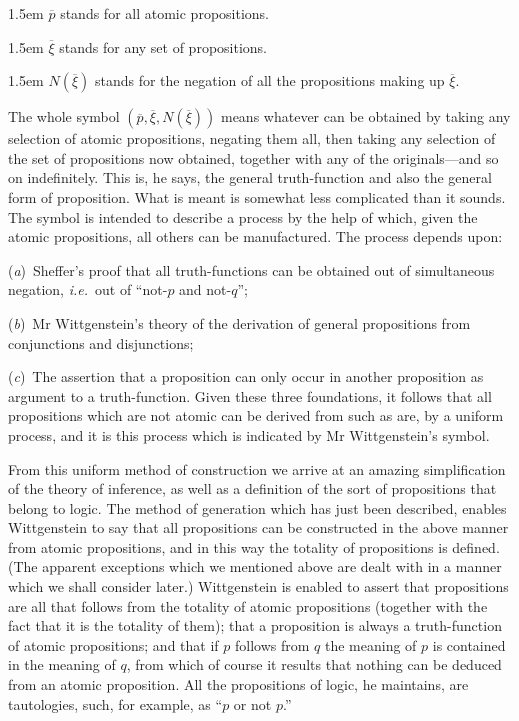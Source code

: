 \documentclass[12pt,oneside]{book}[2007/10/19]
\newcommand{\DPtypo}[2]{#2}
\newcommand{\idEst}{\textit{i.e.}}
\begin{document}
\begin{center}{%
\begin{minipage}{0.65\textwidth}

\noindent\hangindent 1.5em $\overline{p}$ stands for all atomic propositions.

\noindent\hangindent 1.5em $\overline{\xi}$ stands for any set of propositions.

\noindent\hangindent 1.5em $\DPtypo{\overline{N}}{N}(\overline{\xi})$ stands for the negation of all the propositions
making up $\overline{\xi}$.
\end{minipage}%
}\end{center}

The whole symbol $(\overline{p}, \overline{\xi}, \DPtypo{\overline{N}}{N}(\overline{\xi}))$ means whatever can be
obtained by taking any selection of atomic propositions,
negating them all, then taking any selection of the set
of propositions now obtained, together with any of the
originals---and so on indefinitely. This is, he says, the
general truth-function and also the general form of proposition.
What is meant is somewhat less complicated
than it sounds. The symbol is intended to describe a
process by the help of which, given the atomic propositions,
all others can be manufactured. The process depends
upon:

(\textit{a})~Sheffer's proof that all truth-functions can be
obtained out of simultaneous negation, \idEst\ out of ``not-$p$
and not-$q$'';

(\textit{b})~Mr Wittgenstein's theory of the derivation of
general propositions from conjunctions and disjunctions;

(\textit{c})~The assertion that a proposition can only occur in
another proposition as argument to a truth-function.
Given these three foundations, it follows that all propositions
which are not atomic can be derived from such
as are, by a uniform process, and it is this process which
is indicated by Mr Wittgenstein's symbol.

From this uniform method of construction we arrive
at an amazing simplification of the theory of inference,
as well as a definition of the sort of propositions that
belong to logic. The method of generation which has
just been described, enables Wittgenstein to say that all
propositions can be constructed in the above manner from
atomic propositions, and in this way the totality of propositions
is defined. (The apparent exceptions which we
mentioned above are dealt with in a manner which we
shall consider later.) Wittgenstein is enabled to assert
that propositions are all that follows from the totality of
atomic propositions (together with the fact that it is the
totality of them); that a proposition is always a truth-function
of atomic propositions; and that if $p$ follows from
$q$ the meaning of $p$ is contained in the meaning of $q$, from
which of course it results that nothing can be deduced
from an atomic proposition. All the propositions of logic,
he maintains, are tautologies, such, for example, as ``$p$
or not $p$.''
\end{document}
